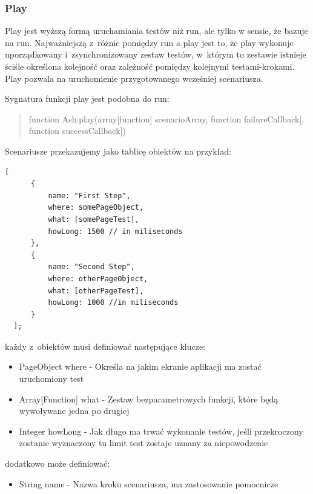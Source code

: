 \documentclass[brudnopis]{xmgr}
\begin{document}
\subsubsection{Play} 

Play jest wyższą formą uruchamiania testów niż run, ale tylko w sensie, że bazuje na run. Najważniejszą z~różnic pomiędzy run a play jest to, że play wykonuje uporządkowany i~zsynchronizowany zestaw testów, w~którym to zestawie istnieje ściśle określona kolejność oraz zależność pomiędzy kolejnymi testami-krokami. Play pozwala na uruchomienie przygotowanego wcześniej scenariusza. 

Sygnatura funkcji play jest podobna do run:

\begin{quote}
function Ash.play(array[function] scenarioArray, function failureCallback[, function successCallback]) 
\end{quote}

Scenariusze przekazujemy jako tablicę obiektów na przykład:

\begin{lstlisting}
[
      {
          name: "First Step",
          where: somePageObject,
          what: [somePageTest],
          howLong: 1500	// in miliseconds
      },
      {
          name: "Second Step",
          where: otherPageObject,
          what: [otherPageTest],
          howLong: 1000	//in miliseconds
      }
  ];
\end{lstlisting}

każdy z~obiektów musi definiować następujące klucze:

\begin{itemize}
  \item PageObject where - Określa na jakim ekranie aplikacji ma zostać uruchomiony test
  \item Array[Function] what - Zestaw bezparametrowych funkcji, które będą wywoływane jedna po drugiej 
  \item Integer howLong - Jak długo ma trwać wykonanie testów, jeśli przekroczony zostanie wyznaczony tu limit test zostaje uznany za niepowodzenie 
\end{itemize}

dodatkowo może definiować:

\begin{itemize} 
  \item String name - Nazwa kroku scenariusza, ma zastosowanie pomocnicze
\end{itemize}
\end{document}
